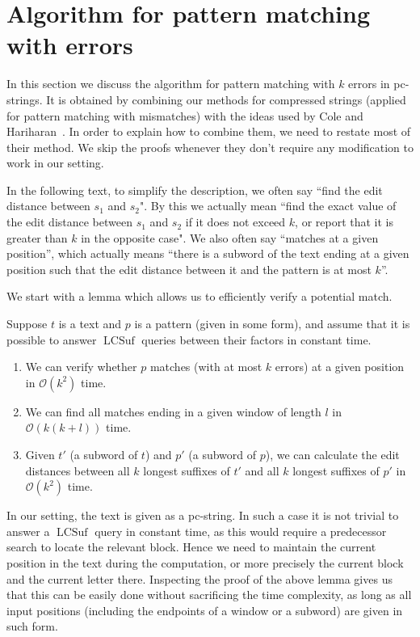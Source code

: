\documentclass[runningheads]{llncs}
\DeclareMathOperator{\LCSuf}{LCSuf}
\begin{document}
\section{Algorithm for pattern matching with errors}
\label{section:errors}
In this section we discuss the algorithm for pattern matching with $k$ errors in pc-strings. It is obtained by combining our methods for compressed strings (applied for pattern matching with mismatches) with the ideas used by Cole and Hariharan~\cite{ColeHariharan}. In order to explain how to combine them, we need to restate most of their method. We skip the proofs whenever they don't require any modification to work in our setting.

In the following text, to simplify the description, we often say ``find the edit distance between $s_1$ and $s_2$". By this we actually mean ``find the exact value of the edit distance between $s_1$ and $s_2$ if it does not exceed $k$,  or report that it is greater than $k$ in the opposite case". We also often say ``matches at a given position'', which actually means ``there is a subword of the text ending at a given position such that the edit distance between it and the pattern is at most $k$''.

We start with a lemma which allows us to efficiently verify a potential match.

\begin{lemma}\label{lemma:verify_match}
Suppose $t$ is a text and $p$ is a pattern (given in some form), and assume that it is possible to answer $\LCSuf$ queries between their factors in constant time.
\begin{enumerate}
\item{We can verify whether $p$ matches (with at most $k$ errors) at a given position in $\mathcal{O}(k^2)$ time.}
\item{We can find all matches ending in a given window of length $l$ in $\mathcal{O}(k(k+l))$ time.}
\item{Given $t'$ (a subword of $t$) and $p'$ (a subword of $p$), we can calculate the edit distances between all $k$ longest suffixes of $t'$ and all $k$ longest suffixes of $p'$ in $\mathcal{O}(k^2)$ time.}
\end{enumerate}
\end{lemma}

In our setting, the text is given as a pc-string. In such a case it is not trivial to answer a $\LCSuf$ query in constant time, as this would require a predecessor search to locate the relevant block. Hence we need to maintain the current position in the text during the computation, or more precisely the current block and the current letter there. Inspecting the proof of the above lemma gives us that this can be easily done without sacrificing the time complexity, as long as all input positions (including the endpoints of a window or a subword) are given in such form.
\end{document}
